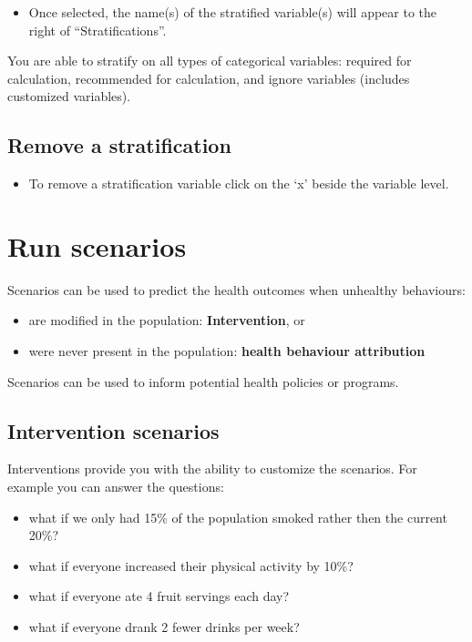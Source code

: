 \documentclass[]{book}
\providecommand{\tightlist}{%
  \setlength{\itemsep}{0pt}\setlength{\parskip}{0pt}}
\begin{document}
\begin{itemize}
\tightlist
\item
  Once selected, the name(s) of the stratified variable(s) will appear to the right of ``Stratifications''.
\end{itemize}

You are able to stratify on all types of categorical variables: required for calculation, recommended for calculation, and ignore variables (includes customized variables).

\hypertarget{remove-a-stratification}{%
\subsection{Remove a stratification}\label{remove-a-stratification}}

\begin{itemize}
\tightlist
\item
  To remove a stratification variable click on the `x' beside the variable level.
\end{itemize}

\hypertarget{run-scenarios}{%
\section{Run scenarios}\label{run-scenarios}}

Scenarios can be used to predict the health outcomes when unhealthy behaviours:

\begin{itemize}
\tightlist
\item
  are modified in the population: \textbf{Intervention}, or
\item
  were never present in the population: \textbf{health behaviour attribution}
\end{itemize}

Scenarios can be used to inform potential health policies or programs.

\hypertarget{intervention-scenarios}{%
\subsection{Intervention scenarios}\label{intervention-scenarios}}

Interventions provide you with the ability to customize the scenarios. For example you can answer the questions:

\begin{itemize}
\tightlist
\item
  what if we only had 15\% of the population smoked rather then the current 20\%?
\item
  what if everyone increased their physical activity by 10\%?
\item
  what if everyone ate 4 fruit servings each day?
\item
  what if everyone drank 2 fewer drinks per week?
\end{itemize}
\end{document}
